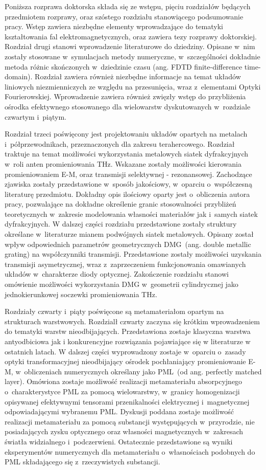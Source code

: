 Poniższa rozprawa doktorska składa się ze wstępu, pięciu rozdziałów  będących przedmiotem rozprawy, oraz szóstego rozdziału stanowiącego podsumowanie pracy. Wstęp zawiera niezbędne elementy wprowadzające do tematyki kształtowania fal elektromagnetycznych, oraz zawiera tezy rozprawy doktorskiej. Rozdział drugi stanowi wprowadzenie literaturowe do dziedziny. Opisane w~nim zostały stosowane w~symulacjach metody numeryczne, w~szczególności dokładnie metoda różnic skończonych w~dziedzinie czasu (ang. FDTD finite-difference time-domain). Rozdział zawiera również niezbędne informacje na temat układów liniowych niezmienniczych ze względu na przesunięcia, wraz z~elementami Optyki Fourierowskiej. Wprowadzenie zawiera również zwięzły wstęp do przybliżenia ośrodka efektywnego stosowanego dla wielowarstw dyskutowanych w~rozdziale czwartym i~piątym.

Rozdział trzeci poświęcony jest projektowaniu układów opartych na metalach i~półprzewodnikach, przeznaczonych dla zakresu terahercowego. Rozdział traktuje na temat możliwości wykorzystania metalowych siatek dyfrakcyjnych w~roli anten promieniowania THz. Wskazane zostały możliwości kierowania promieniowaniem E-M, oraz transmisji  selektywnej - rezonansowej. Zachodzące zjawiska zostały przedstawione w~sposób jakościowy, w~oparciu o~współczesną literaturę przedmiotu. Dokładny opis ilościowy oparty jest o~obliczenia autora pracy, pozwalające na dokładne określenie granic stosowalności przybliżeń teoretycznych w~zakresie modelowania własności materiałów jak i~samych siatek dyfrakcyjnych. W dalszej części rozdziału przedstawione zostały struktury określane w~literaturze mianem podwójnych siatek metalowych. Opisany został wpływ odpowiednich parametrów geometrycznych DMG~(ang. double metallic grating) na współczynniki transmisji. Przedstawione zostały możliwości uzyskania transmisji asymetrycznej, wraz z~zaprzeczeniem funkcjonowania omawianych układów w~charakterze diody optycznej. Zakończenie rozdziału stanowi omówienie możliwości wykorzystania DMG w~geometrii cylindrycznej jako jednokierunkowej soczewki promieniowania THz.

Rozdziały czwarty i~piąty poświęcone są metamateriałom opartym na strukturach warstwowych. Rozdzialł czwarty zaczyna się krótkim wprowadzeniem do tematyki warstw nieodbijających. Przedstawiona zostaje klasyczna warstwa antyodbiciowa jak i konkurencyjne rozwiązania pojawiające się w literaturze w ostatnich latach. W dalszej części wyprowadzony zostaje w~oparciu o~zasady optyki transformacyjnej nieodbijający ośrodek pochłaniający promieniowanie E-M, w~obliczeniach numerycznych określany jako PML~(od ang. perfectly matched layer). Omówiona zostaje możliwość realizacji metamateriału absorpcyjnego o~charakterystyce PML za pomocą wielowarstwy, w~granicy homogenizacji opisywanej efektywnymi tensorami przenikalności elektrycznej i~magnetycznej odpowiadającymi wybranemu PML. Dyskusji poddana zostaje możliwość realizacji metamateriału za pomocą substancji występujących w~przyrodzie, nie posiadających zysku optycznego oraz własności magnetycznych w~zakresach światła widzialnego i~podczerwieni. Ostatecznie przedstawione są wyniki eksperymentów numerycznych dla metamateriału o~własnościach podobnych do PML składającego się z~rzeczywistych substancji.

